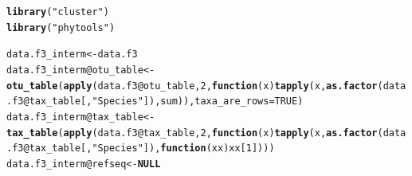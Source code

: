 \documentclass[12pt]{article}\usepackage[]{graphicx}\usepackage[]{color}
\makeatletter
\newcommand{\hlnum}[1]{\textcolor[rgb]{0.686,0.059,0.569}{#1}}%
\newcommand{\hlstr}[1]{\textcolor[rgb]{0.192,0.494,0.8}{#1}}%
\newcommand{\hlopt}[1]{\textcolor[rgb]{0,0,0}{#1}}%
\newcommand{\hlstd}[1]{\textcolor[rgb]{0.345,0.345,0.345}{#1}}%
\newcommand{\hlkwa}[1]{\textcolor[rgb]{0.161,0.373,0.58}{\textbf{#1}}}%
\newcommand{\hlkwb}[1]{\textcolor[rgb]{0.69,0.353,0.396}{#1}}%
\newcommand{\hlkwc}[1]{\textcolor[rgb]{0.333,0.667,0.333}{#1}}%
\newcommand{\hlkwd}[1]{\textcolor[rgb]{0.737,0.353,0.396}{\textbf{#1}}}%
\newenvironment{kframe}{%
 \def\at@end@of@kframe{}%
 \ifinner\ifhmode%
  \def\at@end@of@kframe{\end{minipage}}%
  \begin{minipage}{\columnwidth}%
 \fi\fi%
 \def\FrameCommand##1{\hskip\@totalleftmargin \hskip-\fboxsep
 \colorbox{shadecolor}{##1}\hskip-\fboxsep
     \hskip-\linewidth \hskip-\@totalleftmargin \hskip\columnwidth}%
 \MakeFramed {\advance\hsize-\width
   \@totalleftmargin\z@ \linewidth\hsize
   \@setminipage}}%
 {\par\unskip\endMakeFramed%
 \at@end@of@kframe}
\newenvironment{knitrout}{}{} %
\numberwithin{figure}{section}
\makeatother
\begin{document}
\begin{knitrout}\small
{}\color{fgcolor}\begin{kframe}
\begin{alltt}
\hlkwd{library}\hlstd{(}\hlstr{"cluster"}\hlstd{)}
\hlkwd{library}\hlstd{(}\hlstr{"phytools"}\hlstd{)}
\end{alltt}


{\ttfamily\noindent\itshape\color{messagecolor}{\#\# Loading required package: maps}}

{\ttfamily\noindent\itshape\color{messagecolor}{\#\# \\\#\# Attaching package: 'maps'}}

{\ttfamily\noindent\itshape\color{messagecolor}{\#\# The following object is masked from 'package:plyr':\\\#\# \\\#\#\ \ \ \  ozone}}

{\ttfamily\noindent\itshape\color{messagecolor}{\#\# The following object is masked from 'package:cluster':\\\#\# \\\#\#\ \ \ \  votes.repub}}\begin{alltt}
\hlstd{data.f3_interm} \hlkwb{<-} \hlstd{data.f3}
\hlstd{data.f3_interm}\hlopt{@}\hlkwc{otu_table} \hlkwb{<-} \hlkwd{otu_table}\hlstd{(}\hlkwd{apply}\hlstd{(data.f3}\hlopt{@}\hlkwc{otu_table}\hlstd{,} \hlnum{2}\hlstd{,} \hlkwa{function}\hlstd{(}\hlkwc{x}\hlstd{)} \hlkwd{tapply}\hlstd{(x,} \hlkwd{as.factor}\hlstd{(data.f3}\hlopt{@}\hlkwc{tax_table}\hlstd{[,}\hlstr{"Species"}\hlstd{]), sum)),} \hlkwc{taxa_are_rows} \hlstd{=} \hlnum{TRUE}\hlstd{)}
\hlstd{data.f3_interm}\hlopt{@}\hlkwc{tax_table} \hlkwb{<-} \hlkwd{tax_table}\hlstd{(}\hlkwd{apply}\hlstd{(data.f3}\hlopt{@}\hlkwc{tax_table}\hlstd{,} \hlnum{2}\hlstd{,} \hlkwa{function}\hlstd{(}\hlkwc{x}\hlstd{)} \hlkwd{tapply}\hlstd{(x,} \hlkwd{as.factor}\hlstd{(data.f3}\hlopt{@}\hlkwc{tax_table}\hlstd{[,}\hlstr{"Species"}\hlstd{]),} \hlkwa{function}\hlstd{(}\hlkwc{xx}\hlstd{) xx[}\hlnum{1}\hlstd{])))}
\hlstd{data.f3_interm}\hlopt{@}\hlkwc{refseq} \hlkwb{<-} \hlkwa{NULL}


\end{alltt}
\end{kframe}
\end{knitrout}
\end{document}
